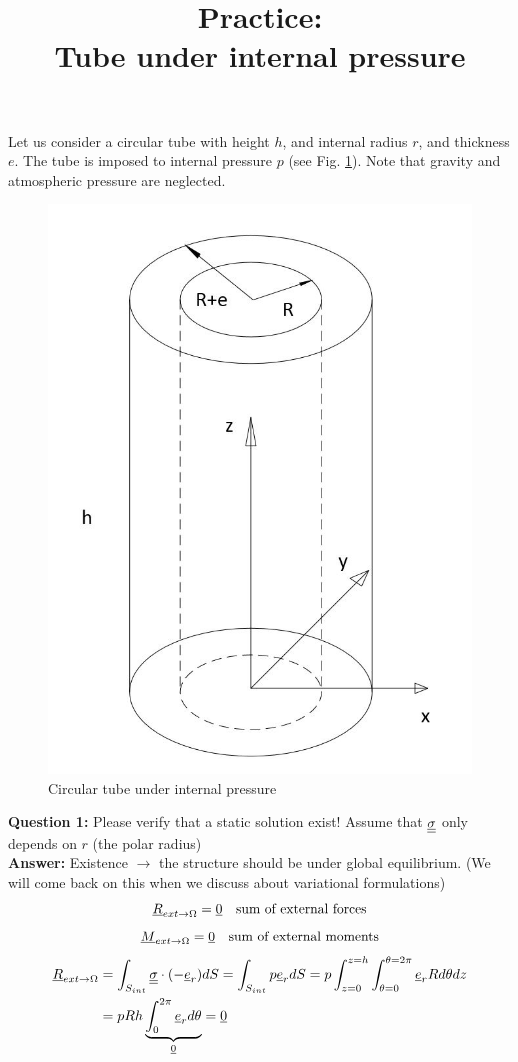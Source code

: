 \documentclass[letter,12pt]{article}
\begin{document}
\pagestyle{fancy}

\title{\textbf{Practice: \\ Tube under internal pressure}}
\date{}

\maketitle

\vspace{-1cm}


Let us consider a circular tube with height $h$, and internal radius $r$, and thickness $e$. The tube is imposed to internal pressure $p$ (see Fig. \ref{fig:replacewithrealfigure}). Note that gravity and atmospheric pressure are neglected.

\begin{figure}[ht]
	\centering
	\includegraphics[width=0.5\linewidth]{figures/p1}
	\caption{Circular tube under internal pressure}
	\label{fig:replacewithrealfigure}
\end{figure}



\noindent \textbf{Question 1:} Please verify that a static solution exist! Assume that $\underline{\underline{\sigma}}$ only depends on $r$ (the polar radius)\\

\textbf{Answer:} Existence $\rightarrow$ the structure should be under global equilibrium. (We will come back on this when we discuss about variational formulations)
\begin{equation}
\underline{R}_{ext\rightarrow \Omega} = \underline{0}  \quad \text{sum of external forces}
\end{equation}
\begin{equation}
\underline{M}_{ext\rightarrow \Omega} = \underline{0}  \quad \text{sum of external moments}
\end{equation}
\begin{equation}
\begin{split}
\underline{R}_{ext\rightarrow \Omega} &= \int_{S_{int}} \underline{\underline{\sigma}} \cdot (-\underline{e}_r) dS = \int_{S_{int}} p \underline{e}_r dS = p \int_{z = 0}^{z = h} \int_{\theta = 0}^{\theta = 2\pi} \underline{e}_r R 
d\theta dz \\
&= pRh\underbrace{\int_{0}^{2\pi} \underline{e}_r d\theta}_{\underline{0}} = \underline{0}
\end{split}
\end{equation}
\end{document}
